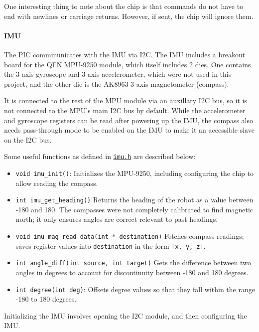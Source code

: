 \documentclass[]{article}
\providecommand{\tightlist}{%
  \setlength{\itemsep}{0pt}\setlength{\parskip}{0pt}}
\let\oldparagraph\paragraph
\renewcommand{\paragraph}[1]{\oldparagraph{#1}\mbox{}}
\begin{document}
One interesting thing to note about the chip is that commands do not
have to end with newlines or carriage returns. However, if sent, the
chip will ignore them.

\hypertarget{imu}{%
\paragraph{IMU}\label{imu}}

The PIC commmunicates with the IMU via I2C. The IMU includes a breakout
board for the QFN MPU-9250 \cite{mpu9250datasheet} \cite{mpu9250regmap} module, which itself includes 2 dies. One
contains the 3-axis gyroscope and 3-axis accelerometer, which were not
used in this project, and the other die is the AK8963 3-axis
magnetometer (compass). \cite{ak8963cdatasheet}

It is connected to the rest of the MPU module via an auxillary I2C bus,
so it is not connected to the MPU's main I2C bus by default. While the
accelerometer and gyroscope registers can be read after powering up the
IMU, the compass also needs pass-through mode to be enabled on the IMU
to make it an accessible slave on the I2C bus.

Some useful functions as defined in
\href{generated/imu.h.html}{\texttt{imu.h}} are described below:

\begin{itemize}
\tightlist
\item
  \texttt{void\ imu\_init()}: Initializes the MPU-9250, including
  configuring the chip to allow reading the compass.
\item
  \texttt{int\ imu\_get\_heading()} Returns the heading of the robot as
  a value between -180 and 180. The compasses were not completely
  calibrated to find magnetic north; it only ensures angles are correct
  relevant to past headings.
\item
  \texttt{void\ imu\_mag\_read\_data(int\ *\ destination)} Fetches
  compass readings; saves register values into \texttt{destination} in
  the form \texttt{{[}x,\ y,\ z{]}}.
\item
  \texttt{int\ angle\_diff(int\ source,\ int\ target)} Gets the
  difference between two angles in degrees to account for discontinuity
  between -180 and 180 degrees.
\item
  \texttt{int\ degree(int\ deg)}: Offsets degree values so that they
  fall within the range -180 to 180 degrees.
\end{itemize}

Initializing the IMU involves opening the I2C module, and then
configuring the IMU.
\end{document}
